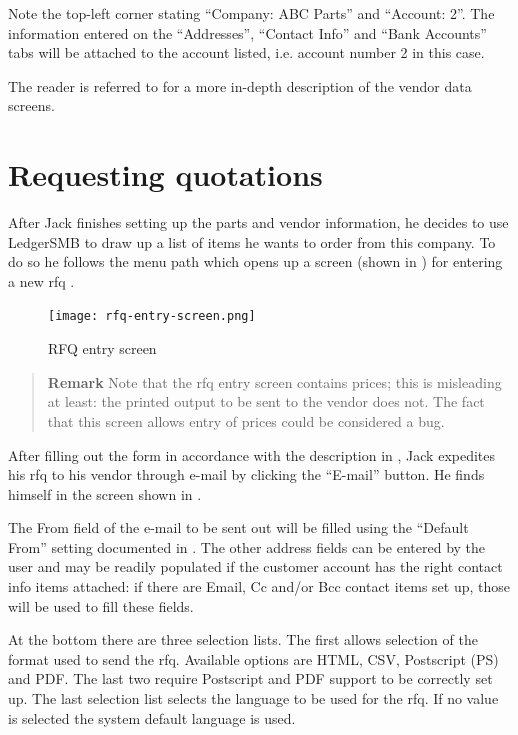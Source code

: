 Note the top-left corner stating ``Company: ABC Parts'' and ``Account: 2''. The information
entered on the ``Addresses'', ``Contact Info'' and ``Bank Accounts'' tabs will be attached
to the account listed, i.e. account number 2 in this case.

The reader is referred to  for a more in-depth
description of the vendor data screens.

\section{Requesting quotations}
\label{sec-stock-request-quotation}

After Jack finishes setting up the parts and vendor information, he decides to use LedgerSMB to draw
up a list of items he wants to order from this company. To do so he follows the menu path
 which opens up a screen (shown
in ) for entering a new \gls{rfq} .

\begin{figure}[h]
\centering
\texttt{[image: rfq-entry-screen.png]}
\caption{RFQ entry screen}
\label{fig:bus-rfq-entry-screen}
\end{figure}

\begin{quote}
\textbf{Remark} Note that the \gls{rfq} entry screen contains prices; this is misleading
at least: the printed output to be sent to the vendor does not. The fact that this screen
allows entry of prices could be considered a bug.
\end{quote}

After filling out the form in accordance with the description in ,
Jack expedites his \gls{rfq} to his vendor through e-mail by clicking the ``E-mail'' button. He finds
himself in the screen shown in .

The From field of the e-mail to be sent out will be filled using the ``Default From'' setting documented
in . The other address fields can be entered by the user and may be readily
populated if the customer account has the right contact info items attached: if there are Email, Cc and/or
Bcc contact items set up, those will be used to fill these fields.

At the bottom there are three selection lists. The first allows selection of the format used to send the
\gls{rfq}. Available options are HTML, CSV, Postscript (PS) and PDF. The last two require Postscript and PDF
support to be correctly set up. The last selection list selects the language to be used for the
\gls{rfq}. If no value is selected the system default language is used.

